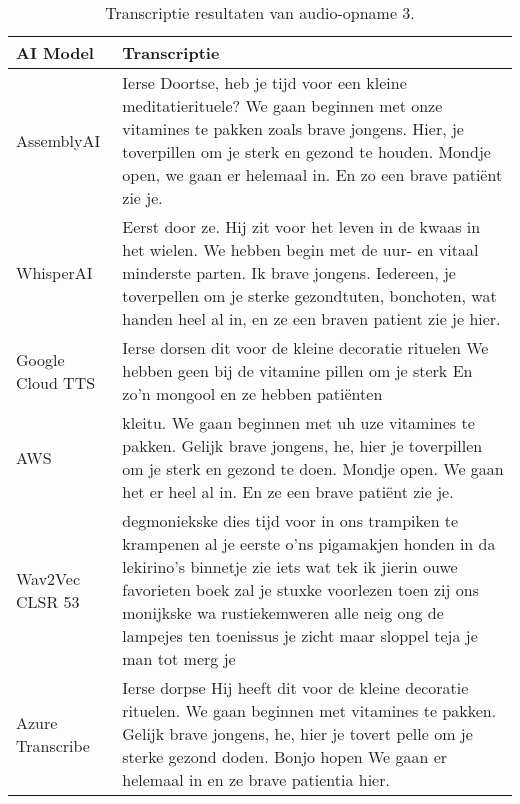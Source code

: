 \begin{table}[htbp]
    \centering
    \label{tab:results_sample3}
        \caption{Transcriptie resultaten van audio-opname 3.}
    \begin{tabularx}{\textwidth}{|l|X|}
        \hline
        \textbf{AI Model} & \textbf{Transcriptie} \\ \midrule
        
        AssemblyAI &      Ierse Doortse, heb je tijd voor een kleine meditatierituele? We gaan beginnen met onze vitamines te pakken zoals brave jongens. Hier, je toverpillen om je sterk en gezond te houden. Mondje open, we gaan er helemaal in. En zo een brave patiënt zie je.
        
        \\ \hline
        
        WhisperAI &     Eerst door ze. Hij zit voor het leven in de kwaas in het wielen. We hebben begin met de uur- en vitaal minderste parten. Ik brave jongens. Iedereen, je toverpellen om je sterke gezondtuten, bonchoten, wat handen heel al in, en ze een braven patient zie je hier.
        
        \\ \hline
        
        Google Cloud TTS &    Ierse dorsen dit voor de kleine decoratie rituelen We hebben geen bij de vitamine pillen om je sterk En zo'n mongool en ze hebben patiënten
        
        \\ \hline
        
        AWS &       kleitu. We gaan beginnen met uh uze vitamines te pakken. Gelijk brave jongens, he, hier je toverpillen om je sterk en gezond te doen. Mondje open. We gaan het er heel al in. En ze een brave patiënt zie je.
        
        \\ \hline
        
        Wav2Vec CLSR 53 &     degmoniekske dies tijd voor in ons trampiken te krampenen al je eerste o'ns pigamakjen honden in da lekirino's binnetje zie iets wat tek ik jierin ouwe favorieten boek zal je stuxke voorlezen toen zij ons monijkske wa rustiekemweren alle neig ong de lampejes ten toenissus je zicht maar sloppel teja je man tot merg je
        \\ \hline
        
        Azure Transcribe &        Ierse dorpse Hij heeft dit voor de kleine decoratie rituelen. We gaan beginnen met vitamines te pakken. Gelijk brave jongens, he, hier je tovert pelle om je sterke gezond doden. Bonjo hopen We gaan er helemaal in en ze brave patientia hier.
        
        \\ \hline
    \end{tabularx}

\end{table}
\FloatBarrier

